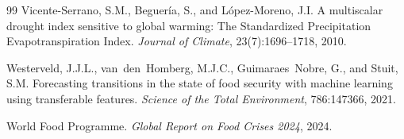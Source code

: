 \documentclass[11pt,letterpaper]{article}
\begin{document}
\begin{thebibliography}{99}
Vicente-Serrano, S.M., Beguer{\'i}a, S., and L{\'o}pez-Moreno, J.I.
\newblock A multiscalar drought index sensitive to global warming: The Standardized Precipitation Evapotranspiration Index.
\newblock \textit{Journal of Climate}, 23(7):1696--1718, 2010.

Westerveld, J.J.L., van~den~Homberg, M.J.C., Guimaraes~Nobre, G., and Stuit, S.M.
\newblock Forecasting transitions in the state of food security with machine learning using transferable features.
\newblock \textit{Science of the Total Environment}, 786:147366, 2021.

World Food Programme.
\newblock \textit{Global Report on Food Crises 2024}, 2024.

\end{thebibliography}
\end{document}
